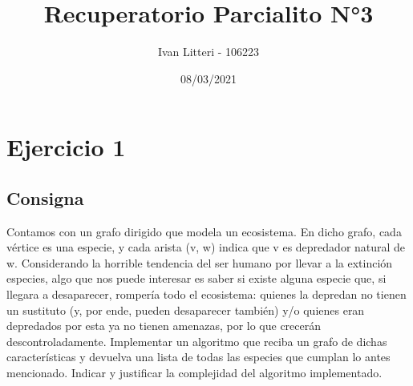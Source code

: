 \documentclass{article}
\title{Recuperatorio Parcialito N°3}
\author{Ivan Litteri - 106223}
\date{08/03/2021}
\begin{document}
\maketitle

\lstset{language=Python}

\section*{Ejercicio 1}
\subsection*{Consigna}
Contamos con un grafo dirigido que modela un ecosistema. En dicho grafo, cada vértice es una especie, y cada arista (v, w)
indica que v es depredador natural de w. Considerando la horrible tendencia del ser humano por llevar a la extinción especies,
algo que nos puede interesar es saber si existe alguna especie que, si llegara a desaparecer, rompería todo el ecosistema:
quienes la depredan no tienen un sustituto (y, por ende, pueden desaparecer también) y/o quienes eran depredados por
esta ya no tienen amenazas, por lo que crecerán descontroladamente. Implementar un algoritmo que reciba un grafo de
dichas características y devuelva una lista de todas las especies que cumplan lo antes mencionado. Indicar y justificar la
complejidad del algoritmo implementado.
\end{document}
